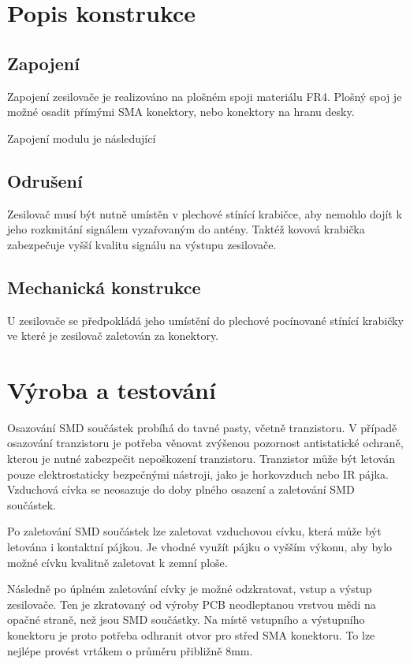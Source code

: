 \documentclass[12pt,a4paper,oneside]{article}
\begin{document}
\section{Popis konstrukce}

\subsection{Zapojení}

Zapojení zesilovače je realizováno na plošném spoji materiálu FR4. Plošný spoj je možné osadit přímými SMA konektory, nebo konektory na hranu desky. 

Zapojení modulu je následující

\subsection{Odrušení}

Zesilovač musí být nutně umístěn v plechové stínící krabičce, aby nemohlo dojít k jeho rozkmitání signálem vyzařovaným do antény. Taktéž kovová krabička zabezpečuje vyšší kvalitu signálu na výstupu zesilovače. 

\subsection{Mechanická konstrukce}

U zesilovače se předpokládá jeho umístění do plechové pocínované stínící krabičky ve které je zesilovač zaletován za konektory. 

\section{Výroba a testování}

Osazování SMD součástek probíhá do tavné pasty, včetně tranzistoru. V případě osazování tranzistoru je potřeba věnovat zvýšenou pozornost antistatické ochraně, kterou je nutné zabezpečit nepoškození tranzistoru. Tranzistor může být letován pouze elektrostaticky bezpečnými nástroji, jako je horkovzduch nebo IR pájka. 
Vzduchová cívka se neosazuje do doby plného osazení a zaletování SMD součástek. 

Po zaletování SMD součástek lze zaletovat vzduchovou cívku, která může být letována i kontaktní pájkou. Je vhodné využít pájku o vyšším výkonu, aby bylo možné cívku kvalitně zaletovat k zemní ploše. 

Následně po úplném zaletování cívky je možné odzkratovat, vstup a výstup zesilovače. Ten je zkratovaný od výroby PCB neodleptanou vrstvou mědi na opačné straně, než jsou SMD součástky. Na místě vstupního a výstupního konektoru je proto potřeba odhranit otvor pro střed SMA konektoru. To lze nejlépe provést vrtákem o průměru přibližně 8mm. 
\end{document}
